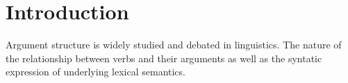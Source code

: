 \section{Introduction}

Argument structure is widely studied and debated in linguistics. The nature of the relationship between verbs and their arguments as well as the syntatic expression of underlying lexical semantics.
